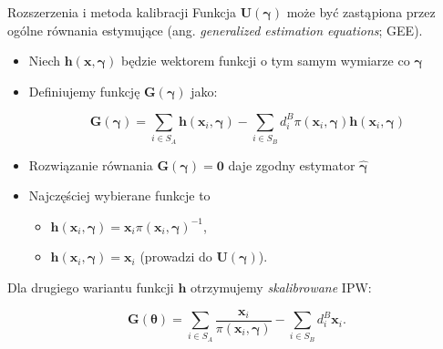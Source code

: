 \documentclass[10pt,ignorenonframetext, aspectratio=169]{beamer}
\newcommand{\bx}{\boldsymbol{x}}
\newcommand{\bh}{\boldsymbol{h}}
\newcommand{\bU}{\boldsymbol{U}}
\newcommand{\bG}{\boldsymbol{G}}
\newcommand{\bgamma}{\boldsymbol{\gamma}}
\newcommand{\btheta}{\boldsymbol{\theta}}
\newcommand{\bZero}{\boldsymbol{0}}
\begin{document}
\begin{frame}{Rozszerzenia i metoda kalibracji}
    Funkcja $\bU(\bgamma)$ może być zastąpiona przez ogólne równania estymujące (ang. \textit{generalized estimation equations}; GEE). 
    
    \begin{itemize}
        \item Niech $\bh(\bx, \bgamma)$ będzie wektorem funkcji o tym samym wymiarze co $\bgamma$
        \item Definiujemy funkcję $\bG(\bgamma)$ jako:
        
        \begin{equation}
        \bG(\bgamma)=\sum_{i \in S_A} \bh\left(\bx_i, \bgamma\right)-\sum_{i \in S_B} d_i^B \pi\left(\bx_i, \bgamma\right) \bh\left(\bx_i, \bgamma\right)
        \end{equation}
        
        \item Rozwiązanie równania $\bG(\bgamma)=\bZero$ daje zgodny estymator $\hat{\bgamma}$
        \item Najczęściej wybierane funkcje to 
        \begin{itemize}
            \item $\bh\left(\bx_i, \bgamma\right) = \bx_i \pi\left(\bx_i, \bgamma\right)^{-1}$,
            \item $\bh\left(\bx_i, \bgamma\right) = \bx_i$ (prowadzi do $\bU(\bgamma)$).
        \end{itemize} 
    \end{itemize}
    
    Dla drugiego wariantu funkcji $\bh$ otrzymujemy \textit{skalibrowane} IPW:
    
    \begin{equation}
    \bG(\btheta) = \sum_{i \in S_A} \frac{\bx_i}{\pi\left(\bx_i, \bgamma\right) }-\sum_{i \in S_B} d_i^B \bx_i.
    \label{eq-ipw-gee}
    \end{equation}
    
\end{frame}
\end{document}
